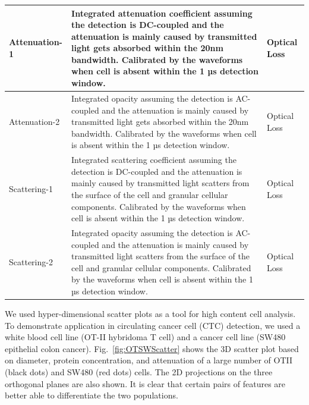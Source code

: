 \documentclass[aps,pra,reprint,superscriptaddress]{revtex4-1}
\begin{document}
\begin{table}[H]
\begin{tabular}{|p{}|p{}|p{}|}
Attenuation-1	 &Integrated attenuation coefficient assuming the detection is DC-coupled and the attenuation is mainly caused by transmitted light gets absorbed within the 20nm bandwidth. Calibrated by the waveforms when cell is absent within the 1 µs detection window.	 &Optical Loss\\ \hline
Attenuation-2	 &Integrated opacity assuming the detection is AC-coupled and the attenuation is mainly caused by transmitted light gets absorbed within the 20nm bandwidth. Calibrated by the waveforms when cell is absent within the 1 µs detection window.  &Optical Loss\\ \hline
Scattering-1	 &Integrated scattering coefficient assuming the detection is DC-coupled and the attenuation is mainly caused by transmitted light scatters from the surface of the cell and granular cellular components. Calibrated by the waveforms when cell is absent within the 1 µs detection window.	 &Optical Loss\\ \hline
Scattering-2	 &Integrated opacity assuming the detection is AC-coupled and the attenuation is mainly caused by transmitted light scatters from the surface of the cell and granular cellular components. Calibrated by the waveforms when cell is absent within the 1 µs detection window.	 &Optical Loss\\ 
\hline
\end{tabular}
\end{table}

We used hyper-dimensional scatter plots as a tool for high content cell analysis. To demonstrate application in circulating cancer cell (CTC) detection, we used a white blood cell line (OT-II hybridoma T cell) and a cancer cell line (SW480 epithelial colon cancer). Fig.~\ref{fig:OTSWScatter} shows the 3D scatter plot based on diameter, protein concentration, and attenuation of a large number of OTII (black dots) and SW480 (red dots) cells. The 2D projections on the three orthogonal planes are also shown. It is clear that certain pairs of features are better able to differentiate the two populations.
\end{document}
